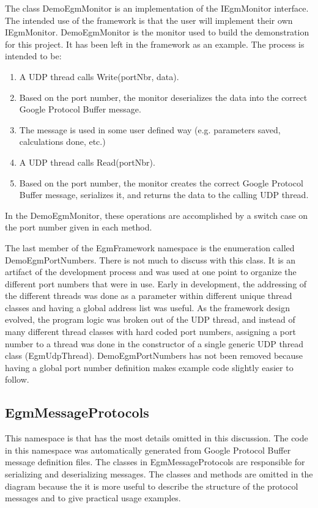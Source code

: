 \documentclass{cslthse-msc}
\begin{document}
The class DemoEgmMonitor is an implementation of the IEgmMonitor interface. The intended use of the framework is that the user will implement their own IEgmMonitor. DemoEgmMonitor is the monitor used to build the demonstration for this project. It has been left in the framework as an example. The process is intended to be:
\begin{enumerate}
    \item A UDP thread calls Write(portNbr, data).
    \item Based on the port number, the monitor deserializes the data into the correct Google Protocol Buffer message.
    \item The message is used in some user defined way (e.g. parameters saved, calculations done, etc.)
    \item A UDP thread calls Read(portNbr).
    \item Based on the port number, the monitor creates the correct Google Protocol Buffer message, serializes it, and returns the data to the calling UDP thread.
\end{enumerate}
In the DemoEgmMonitor, these operations are accomplished by a switch case on the port number given in each method. \par

The last member of the EgmFramework namespace is the enumeration called DemoEgmPortNumbers. There is not much to discuss with this class. It is an artifact of the development process and was used at one point to organize the different port numbers that were in use. Early in development, the addressing of the different threads was done as a parameter within different unique thread classes and having a global address list was useful. As the framework design evolved, the program logic was broken out of the UDP thread, and instead of many different thread classes with hard coded port numbers, assigning a port number to a thread was done in the constructor of a single generic UDP thread class (EgmUdpThread). DemoEgmPortNumbers has not been removed because having a global port number definition makes example code slightly easier to follow. 

\subsection{EgmMessageProtocols}
\label{sec:Result:LthRobotStudio:EgmMessageProtocols}
This namespace is that has the most details omitted in this discussion. The code in this namespace was automatically generated from Google Protocol Buffer message definition files. The classes in EgmMessageProtocols are responsible for serializing and deserializing messages. The classes and methods are omitted in the diagram because the it is more useful to describe the structure of the protocol messages and to give practical usage examples.\par
\end{document}

